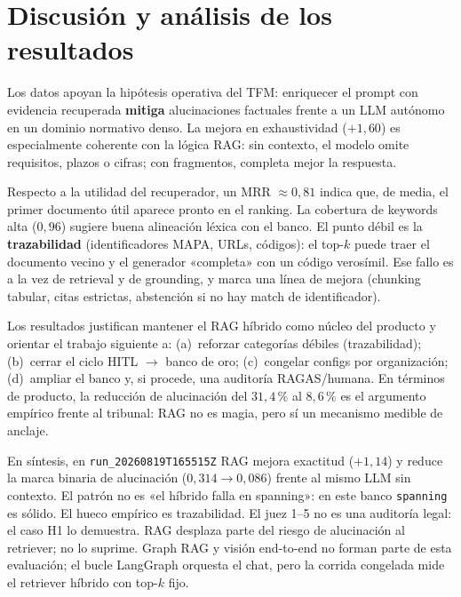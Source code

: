 \section{Discusión y análisis de los resultados}
Los datos apoyan la hipótesis operativa del TFM: enriquecer el prompt con evidencia recuperada \textbf{mitiga} alucinaciones factuales frente a un LLM autónomo en un dominio normativo denso. La mejora en exhaustividad ($+1{,}60$) es especialmente coherente con la lógica RAG: sin contexto, el modelo omite requisitos, plazos o cifras; con fragmentos, completa mejor la respuesta.

Respecto a la utilidad del recuperador, un MRR $\approx 0{,}81$ indica que, de media, el primer documento útil aparece pronto en el ranking. La cobertura de keywords alta ($0{,}96$) sugiere buena alineación léxica con el banco. El punto débil es la \textbf{trazabilidad} (identificadores MAPA, URLs, códigos): el top-$k$ puede traer el documento vecino y el generador «completa» con un código verosímil. Ese fallo es a la vez de retrieval y de grounding, y marca una línea de mejora (chunking tabular, citas estrictas, abstención si no hay match de identificador).

Los resultados justifican mantener el RAG híbrido como núcleo del producto y orientar el trabajo siguiente a: (a)~reforzar categorías débiles (trazabilidad); (b)~cerrar el ciclo HITL $\rightarrow$ banco de oro; (c)~congelar configs por organización; (d)~ampliar el banco y, si procede, una auditoría RAGAS/humana. En términos de producto, la reducción de alucinación del $31{,}4\,\%$ al $8{,}6\,\%$ es el argumento empírico frente al tribunal: RAG no es magia, pero sí un mecanismo medible de anclaje.

En síntesis, en \texttt{run\_20260819T165515Z} RAG mejora exactitud ($+1{,}14$) y reduce la marca binaria de alucinación ($0{,}314\rightarrow 0{,}086$) frente al mismo LLM sin contexto. El patrón no es «el híbrido falla en spanning»: en este banco \texttt{spanning} es sólido. El hueco empírico es trazabilidad. El juez 1--5 no es una auditoría legal: el caso H1 lo demuestra. RAG desplaza parte del riesgo de alucinación al retriever; no lo suprime. Graph RAG y visión end-to-end no forman parte de esta evaluación; el bucle LangGraph orquesta el chat, pero la corrida congelada mide el retriever híbrido con top-$k$ fijo.
